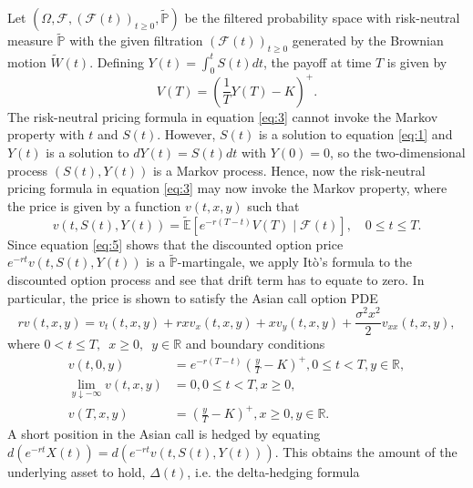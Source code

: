 \newcommand{\F}{\mathcal{F}}
\newcommand{\tP}{\widetilde{\mathbb{P}}}
\newcommand{\tW}{\widetilde{W}(t)}
\newcommand{\E}{\mathbb{E}}
\newcommand{\tE}{\widetilde{\E}}

\label{Valuation Problem for Asian Options}

Let \((\Omega, \F, (\F(t))_{t \geq 0}, \tP)\) be the filtered probability space with risk-neutral measure \(\tP\) with the given filtration \((\F(t))_{t \geq 0}\) generated by the Brownian motion \(\tW\).
Defining \(Y(t) = \int_0^t S(t) dt\), the payoff at time \(T\) is given by
\begin{equation}
    V(T) = \left( \frac{1}{T} Y(T) - K\right)^+. 
\end{equation}
The risk-neutral pricing formula in equation \eqref{eq:3} cannot invoke the Markov property with $t$ and $S(t)$.
However, \(S(t)\) is a solution to equation \eqref{eq:1} and $Y(t)$ is a solution to $dY(t) = S(t) dt$ with $Y(0) = 0$, so the two-dimensional process $(S(t), Y(t))$ is a Markov process.
Hence, now the risk-neutral pricing formula in equation \eqref{eq:3} may now invoke the Markov property, where the price is given by a function $v(t, x, y)$ such that
\begin{equation}
    v(t, S(t), Y(t))=\tE\left[e^{-r(T-t)} V(T) \mid \mathcal{F}(t)\right], \quad 0 \leq t \leq T. \label{eq:5}
\end{equation}
Since equation \eqref{eq:5} shows that the discounted option price \(e^{-rt}v(t, S(t), Y(t))\) is a \(\tP\)-martingale, we apply Itò's formula to the discounted option process and see that drift term has to equate to zero. In particular, the price is shown to satisfy the Asian call option PDE \cite{shreve2004stochastic}
\begin{equation}
    r v(t, x, y) = v_t(t, x, y) + r x v_x(t, x, y) + x v_y(t, x, y) + \frac{\sigma^2 x^2}{2} v_{xx}(t, x, y), \label{eq:6}
\end{equation}
where $0<t\leq T, \enspace x \geq 0, \enspace y \in \mathbb{R}$ and boundary conditions
\begin{align*}
    v(t, 0, y) & =e^{-r(T-t)}\left(\frac{y}{T}-K\right)^{+}, 0 \leq t<T, y \in \mathbb{R}, \\
\lim _{y \downarrow-\infty} v(t, x, y) & =0,0 \leq t<T, x \geq 0, \\
v(T, x, y) & =\left(\frac{y}{T}-K\right)^{+}, x \geq 0, y \in \mathbb{R}.
\end{align*}
A short position in the Asian call is hedged by equating \(d(e^{-rt}X(t)) = d(e^{-rt} v(t, S(t), Y(t)))\). This obtains the amount of the underlying asset to hold, $\Delta(t)$, i.e. the delta-hedging formula
